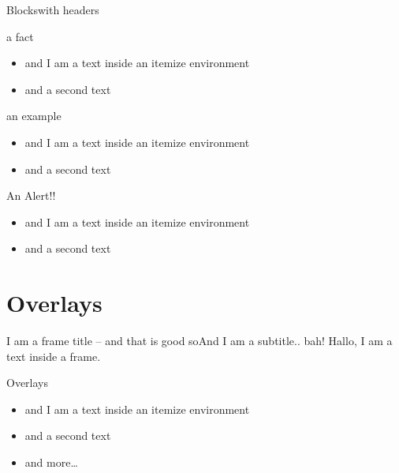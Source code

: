 \documentclass[%
	english,  %
	]{beamer}
\begin{document}
\begin{frame}{Blocks}{with headers}
\begin{block}{a fact}
\begin{itemize}
\item and I am a text inside an itemize environment
\item and a second text
\end{itemize}
\end{block}

\vfill

\begin{exampleblock}{an example}
\begin{itemize}
\item and I am a text inside an itemize environment
\item and a second text
\end{itemize}
\end{exampleblock}

\vfill

\begin{alertblock}{An Alert!!}
\begin{itemize}
\item and I am a text inside an itemize environment
\item and a second text
\end{itemize}
\end{alertblock}
\end{frame}


\section{Overlays}

\begin{frame}{\secname{}}
\end{frame}

\begin{frame}{I am a frame title -- and that is good so}{And I am a subtitle.. bah!}
Hallo, I am a text inside a frame.

\vfill

\begin{block}{Overlays}
\begin{itemize}
\item<+-> and I am a text inside an itemize environment
\item<+-> and a second text
\item<+-> and more\ldots
\end{itemize}
\end{block}
\end{frame}
\end{document}
